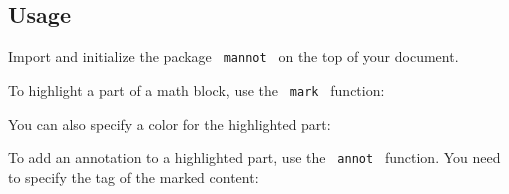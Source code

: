 \pandocbounded{}

\subsection{Usage}\label{usage}

Import and initialize the package \texttt{\ mannot\ } on the top of your
document.

\begin{Shaded}
\begin{Highlighting}[]
\end{Highlighting}
\end{Shaded}

To highlight a part of a math block, use the \texttt{\ mark\ } function:

\begin{Shaded}
\begin{Highlighting}[]
\NormalTok{$}
\NormalTok{$}
\end{Highlighting}
\end{Shaded}

\pandocbounded{}

You can also specify a color for the highlighted part:

\begin{Shaded}
\begin{Highlighting}[]
\NormalTok{$}
\end{Highlighting}
\end{Shaded}

\pandocbounded{}

To add an annotation to a highlighted part, use the \texttt{\ annot\ }
function. You need to specify the tag of the marked content:

\begin{Shaded}
\begin{Highlighting}[]
\NormalTok{$}
\NormalTok{$}
\end{Highlighting}
\end{Shaded}

